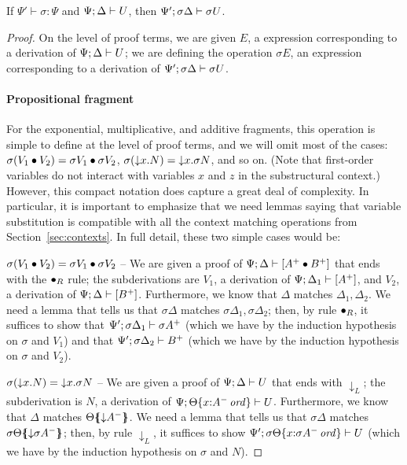 \bigskip
\begin{theorem}
\label{thm:varsubst}
If $\Psi' \vdash \sigma : \Psi$ and ${\Psi};{\Delta} \vdash {U}$, then 
${\Psi'};{\sigma\Delta} \vdash {\sigma{U}}$.
\end{theorem}

\begin{proof}
On the level of proof terms, 
we are given $E$, a expression corresponding to a derivation of
${\Psi};{\Delta} \vdash {U}$; we are defining the operation $\sigma{E}$,
an expression corresponding to a derivation of 
${\Psi'};{\sigma\Delta} \vdash {\sigma{U}}$.

\paragraph{Propositional fragment}
For the exponential, multiplicative, and additive fragments, this
operation is simple to define at the level of proof terms, and we will
omit most of the cases: $\sigma({V_1} \mathbin{\bullet} {V_2}) =
{\sigma{V_1}} \mathbin{\bullet} {\sigma{V_2}}$, $\sigma({\downarrow}{x}.{N}) =
{\downarrow}{x}.{\sigma N}$, and so on. (Note that first-order variables
do not interact with variables $x$ and $z$ in the substructural
context.) However, this compact notation does
capture a great deal of complexity. In particular, it is important to
emphasize that we need lemmas saying that variable substitution is
compatible with all the context matching operations from
Section~\ref{sec:contexts}.  In full detail, these two simple cases
would be:

$\sigma({V_1} \mathbin{\bullet} {V_2}) = {\sigma{V_1}} \mathbin{\bullet} {\sigma{V_2}}$ --
We are given a proof of ${\Psi};{\Delta} \vdash {[A^+ \mathbin{\bullet}B^+]}$ that
ends with the ${\mathbin{\bullet}}_R$ rule; the subderivations are
$V_1$, a derivation of ${\Psi};{\Delta_1} \vdash {[A^+]}$, and
$V_2$, a derivation of ${\Psi};{\Delta} \vdash {[B^+]}$. Furthermore, we know that
$\Delta$ matches $\Delta_1, \Delta_2$. We need a lemma that
tells us that $\sigma\Delta$ matches $\sigma\Delta_1, \sigma\Delta_2$;
then, by rule ${\mathbin{\bullet}}_R$, it suffices to show that
${\Psi'};{\sigma\Delta_1} \vdash {\sigma{A^+}}$ (which we have by the 
induction hypothesis on $\sigma$ and $V_1$) and that
${\Psi'};{\sigma\Delta_2} \vdash {B^+}$ (which we have by the induction hypothesis
on $\sigma$ and $V_2$). 

$\sigma({\downarrow}{x}.{N}) = {\downarrow}{x}.{\sigma N}$ -- We are given a proof
of ${\Psi};{\Delta} \vdash {U}$ that ends with ${\downarrow}_L$; 
the subderivation is $N$, a derivation of
${\Psi};{{\Theta}\{{x{:}{A^-}\,{{\it ord}}}\}} \vdash {U}$. Furthermore, we know that
$\Delta$ matches ${\Theta}\mbox{$\{\hspace{-4pt}\{$}{{\downarrow}A^-}\mbox{$\}\hspace{-4pt}\}$}$. We need a lemma
that tells us that $\sigma\Delta$ matches
${\sigma\Theta}\mbox{$\{\hspace{-4pt}\{$}{{\downarrow}\sigma A^-}\mbox{$\}\hspace{-4pt}\}$}$; then, by 
rule ${\downarrow}_L$, it suffices to show 
${\Psi'};{{\sigma\Theta}\{{x{:}{\sigma{A^-}}\,{{\it ord}}}\}} \vdash {U}$ (which
we have by the induction hypothesis on $\sigma$ and $N$).



\end{proof}
